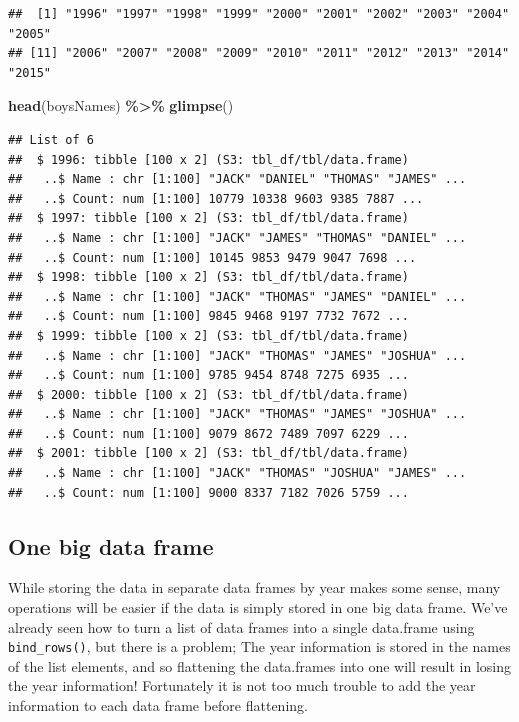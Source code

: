\documentclass[
]{book}
\newenvironment{Shaded}{\begin{snugshade}}{\end{snugshade}}
\newcommand{\KeywordTok}[1]{\textcolor[rgb]{0.13,0.29,0.53}{\textbf{#1}}}
\newcommand{\NormalTok}[1]{#1}
\newcommand{\OperatorTok}[1]{\textcolor[rgb]{0.81,0.36,0.00}{\textbf{#1}}}
\newcommand{\StringTok}[1]{\textcolor[rgb]{0.31,0.60,0.02}{#1}}
\begin{document}
\begin{verbatim}
##  [1] "1996" "1997" "1998" "1999" "2000" "2001" "2002" "2003" "2004" "2005"
## [11] "2006" "2007" "2008" "2009" "2010" "2011" "2012" "2013" "2014" "2015"
\end{verbatim}

\begin{Shaded}
\begin{Highlighting}[]
\KeywordTok{head}\NormalTok{(boysNames) }\OperatorTok{\%\textgreater{}\%}\StringTok{ }\KeywordTok{glimpse}\NormalTok{() }
\end{Highlighting}
\end{Shaded}

\begin{verbatim}
## List of 6
##  $ 1996: tibble [100 x 2] (S3: tbl_df/tbl/data.frame)
##   ..$ Name : chr [1:100] "JACK" "DANIEL" "THOMAS" "JAMES" ...
##   ..$ Count: num [1:100] 10779 10338 9603 9385 7887 ...
##  $ 1997: tibble [100 x 2] (S3: tbl_df/tbl/data.frame)
##   ..$ Name : chr [1:100] "JACK" "JAMES" "THOMAS" "DANIEL" ...
##   ..$ Count: num [1:100] 10145 9853 9479 9047 7698 ...
##  $ 1998: tibble [100 x 2] (S3: tbl_df/tbl/data.frame)
##   ..$ Name : chr [1:100] "JACK" "THOMAS" "JAMES" "DANIEL" ...
##   ..$ Count: num [1:100] 9845 9468 9197 7732 7672 ...
##  $ 1999: tibble [100 x 2] (S3: tbl_df/tbl/data.frame)
##   ..$ Name : chr [1:100] "JACK" "THOMAS" "JAMES" "JOSHUA" ...
##   ..$ Count: num [1:100] 9785 9454 8748 7275 6935 ...
##  $ 2000: tibble [100 x 2] (S3: tbl_df/tbl/data.frame)
##   ..$ Name : chr [1:100] "JACK" "THOMAS" "JAMES" "JOSHUA" ...
##   ..$ Count: num [1:100] 9079 8672 7489 7097 6229 ...
##  $ 2001: tibble [100 x 2] (S3: tbl_df/tbl/data.frame)
##   ..$ Name : chr [1:100] "JACK" "THOMAS" "JOSHUA" "JAMES" ...
##   ..$ Count: num [1:100] 9000 8337 7182 7026 5759 ...
\end{verbatim}

\hypertarget{one-big-data-frame}{%
\subsection{One big data frame}\label{one-big-data-frame}}

While storing the data in separate data frames by year makes some sense, many operations will be easier if the data is simply stored in one big data frame. We've already seen how to turn a list of data frames into a single data.frame using \texttt{bind\_rows()}, but there is a problem; The year information is stored in the names of the list elements, and so flattening the data.frames into one will result in losing the year information! Fortunately it is not too much trouble to add the year information to each data frame before flattening.
\end{document}
